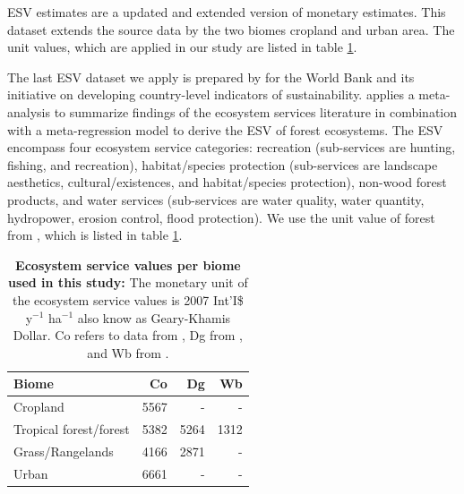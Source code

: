 		\citet{Costanza2014} \ac{ESV} estimates are a updated and extended version of \citet{Groot2012} monetary estimates. This dataset extends the source data by the two biomes cropland and urban area. The unit values, which are applied in our study are listed in table \ref{tab:esv_factors}.

		The last \ac{ESV} dataset we apply is prepared by \citet{Siikamaki2015} for the World Bank and its initiative on developing country-level indicators of sustainability. \citet{Siikamaki2015} applies a meta-analysis to summarize findings of the ecosystem services literature in combination with a meta-regression model to derive the \ac{ESV} of forest ecosystems. The \ac{ESV} encompass four ecosystem service categories: recreation (sub-services are hunting, fishing, and recreation), habitat/species protection (sub-services are landscape aesthetics, cultural/existences, and habitat/species protection), non-wood forest products, and water services (sub-services are water quality, water quantity, hydropower, erosion control, flood protection). We use the unit value of forest from \citet{Siikamaki2015}, which is listed in table \ref{tab:esv_factors}.
		\begin{table}[ht]
			\centering
			\caption[Ecosystem service values used in this study]{\textbf{Ecosystem service values per biome used in this study:} The monetary unit of the ecosystem service values is 2007 Int'I\$ y$^{-1}$ ha$^{-1}$ also know as Geary-Khamis Dollar. Co refers to data from \citet{Costanza2014}, Dg from \citet{Groot2012}, and Wb from \citet{Siikamaki2015}.}
			\label{tab:esv_factors}
			\begin{tabular}{lrrr}
				\hline
				Biome & Co & Dg & Wb \\\hline
				Cropland & 5567 & - & -\\
				Tropical forest/forest & 5382 & 5264 & 1312\\
				Grass/Rangelands & 4166 & 2871 & -\\
				Urban & 6661 & - & -\\\hline
			\end{tabular}
		\end{table}


